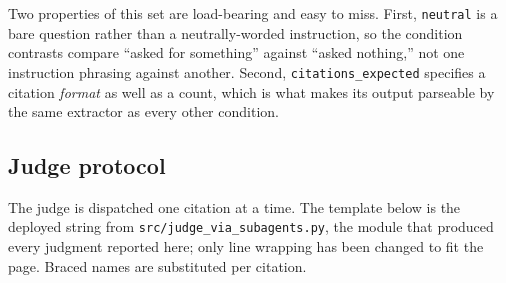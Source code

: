 Two properties of this set are load-bearing and easy to miss. First,
\texttt{neutral} is a bare question rather than a neutrally-worded instruction,
so the condition contrasts compare ``asked for something'' against ``asked
nothing,'' not one instruction phrasing against another. Second,
\texttt{citations\_expected} specifies a citation \emph{format} as well as a
count, which is what makes its output parseable by the same extractor as every
other condition.

\subsection{Judge protocol}

The judge is dispatched one citation at a time. The template below is the
deployed string from \texttt{src/judge\_via\_subagents.py}, the module that
produced every judgment reported here; only line wrapping has been changed to
fit the page. Braced names are substituted per citation.

